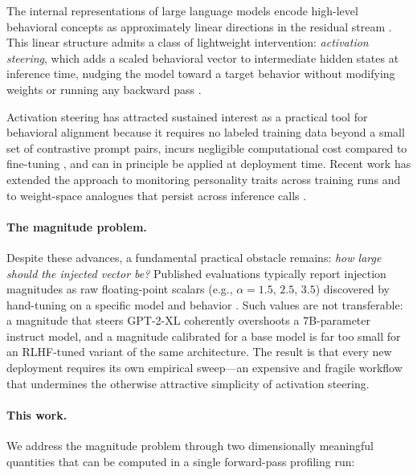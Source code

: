 \documentclass[10pt]{article}
\begin{document}
The internal representations of large language models encode high-level
behavioral concepts as approximately linear directions in the residual stream
\citep{zou2023representation,park2023linear}.  This linear structure admits a
class of lightweight intervention: \emph{activation steering}, which adds a
scaled behavioral vector to intermediate hidden states at inference time, nudging
the model toward a target behavior without modifying weights or running any
backward pass \citep{turner2023activation,rimsky2023steering}.

Activation steering has attracted sustained interest as a practical tool for
behavioral alignment because it requires no labeled training data beyond a small
set of contrastive prompt pairs, incurs negligible computational cost compared
to fine-tuning \citep{ouyang2022instructgpt}, and can in principle be applied at
deployment time.  Recent work has extended the approach to monitoring personality
traits across training runs \citep{chen2025persona} and to weight-space analogues
that persist across inference calls \citep{fierro2025weight}.

\paragraph{The magnitude problem.}
Despite these advances, a fundamental practical obstacle remains: \emph{how
large should the injected vector be?}  Published evaluations typically report
injection magnitudes as raw floating-point scalars (e.g., $\alpha = 1.5$, $2.5$,
$3.5$) discovered by hand-tuning on a specific model and behavior
\citep{rimsky2023steering,zou2023representation}.  Such values are not
transferable: a magnitude that steers GPT-2-XL coherently overshoots a
7B-parameter instruct model, and a magnitude calibrated for a base model is far
too small for an RLHF-tuned variant of the same architecture.  The result is
that every new deployment requires its own empirical sweep---an expensive and
fragile workflow that undermines the otherwise attractive simplicity of
activation steering.

\paragraph{This work.}
We address the magnitude problem through two dimensionally meaningful
quantities that can be computed in a single forward-pass profiling run:
\end{document}
